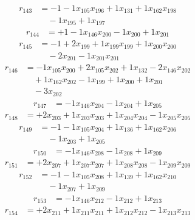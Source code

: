 \[\begin{aligned}
r_{143} &= - 1 - 1 x_{105} x_{196} + 1 x_{131} + 1 x_{162} x_{198} \\
 &\quad - 1 x_{195} + 1 x_{197}
\end{aligned}\]
\[\begin{aligned}
r_{144} &= + 1 - 1 x_{146} x_{200} - 1 x_{200} + 1 x_{201}
\end{aligned}\]
\[\begin{aligned}
r_{145} &= - 1 + 2 x_{199} + 1 x_{199} x_{199} + 1 x_{200} x_{200} \\
 &\quad - 2 x_{201} - 1 x_{201} x_{201}
\end{aligned}\]
\[\begin{aligned}
r_{146} &= - 1 x_{105} x_{200} + 2 x_{105} x_{202} + 1 x_{132} - 2 x_{146} x_{202} \\
 &\quad + 1 x_{162} x_{202} - 1 x_{199} + 1 x_{200} + 1 x_{201} \\
 &\quad - 3 x_{202}
\end{aligned}\]
\[\begin{aligned}
r_{147} &= - 1 x_{146} x_{204} - 1 x_{204} + 1 x_{205}
\end{aligned}\]
\[\begin{aligned}
r_{148} &= + 2 x_{203} + 1 x_{203} x_{203} + 1 x_{204} x_{204} - 1 x_{205} x_{205}
\end{aligned}\]
\[\begin{aligned}
r_{149} &= - 1 - 1 x_{105} x_{204} + 1 x_{136} + 1 x_{162} x_{206} \\
 &\quad - 1 x_{203} + 1 x_{205}
\end{aligned}\]
\[\begin{aligned}
r_{150} &= - 1 x_{146} x_{208} - 1 x_{208} + 1 x_{209}
\end{aligned}\]
\[\begin{aligned}
r_{151} &= + 2 x_{207} + 1 x_{207} x_{207} + 1 x_{208} x_{208} - 1 x_{209} x_{209}
\end{aligned}\]
\[\begin{aligned}
r_{152} &= - 1 - 1 x_{105} x_{208} + 1 x_{139} + 1 x_{162} x_{210} \\
 &\quad - 1 x_{207} + 1 x_{209}
\end{aligned}\]
\[\begin{aligned}
r_{153} &= - 1 x_{146} x_{212} - 1 x_{212} + 1 x_{213}
\end{aligned}\]
\[\begin{aligned}
r_{154} &= + 2 x_{211} + 1 x_{211} x_{211} + 1 x_{212} x_{212} - 1 x_{213} x_{213}
\end{aligned}\]
